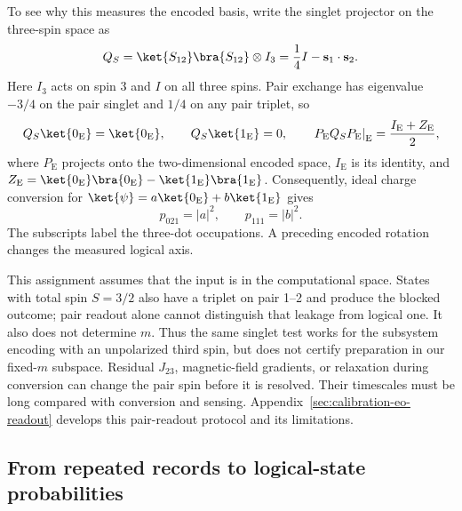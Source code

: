 To see why this measures the encoded basis, write the singlet
projector on the three-spin space as
\begin{equation}
  Q_S=\ket{S_{12}}\bra{S_{12}}\otimes I_3
       =\frac14 I-\mathbf{s}_1\cdot\mathbf{s}_2.
  \label{eq:eo-readout-projector}
\end{equation}
Here $I_3$ acts on spin 3 and $I$ on all three spins.
Pair exchange has eigenvalue $-3/4$ on the pair singlet and $1/4$
on any pair triplet, so
\begin{equation}
  Q_S\ket{0_{\mathrm E}}=\ket{0_{\mathrm E}},\qquad
  Q_S\ket{1_{\mathrm E}}=0,\qquad
  \left.P_{\mathrm E}Q_SP_{\mathrm E}\right|_{\mathrm E}
        =\frac{I_{\mathrm E}+Z_{\mathrm E}}{2},
  \label{eq:eo-logical-readout}
\end{equation}
where $P_{\mathrm E}$ projects onto the two-dimensional encoded
space, $I_{\mathrm E}$ is its identity, and
$Z_{\mathrm E}=\ket{0_{\mathrm E}}\bra{0_{\mathrm E}}
-\ket{1_{\mathrm E}}\bra{1_{\mathrm E}}$.
Consequently, ideal charge conversion for
$\ket{\psi}=a\ket{0_{\mathrm E}}+b\ket{1_{\mathrm E}}$ gives
\begin{equation}
  p_{021}=|a|^2,\qquad p_{111}=|b|^2.
  \label{eq:eo-readout-probabilities}
\end{equation}
The subscripts label the three-dot occupations.
A preceding encoded rotation changes the measured logical axis.

This assignment assumes that the input is in the computational
space. States with total spin $S=3/2$ also have a triplet on pair
1--2 and produce the blocked outcome; pair readout alone cannot
distinguish that leakage from logical one.
It also does not determine $m$. Thus the same singlet test works
for the subsystem encoding with an unpolarized third spin, but
does not certify preparation in our fixed-$m$ subspace.
Residual $J_{23}$, magnetic-field gradients, or relaxation during
conversion can change the pair spin before it is resolved.
Their timescales must be long compared with conversion and sensing.
Appendix~\ref{sec:calibration-eo-readout} develops this pair-readout
protocol and its limitations.

\subsection{From repeated records to logical-state probabilities}
\label{sec:platform-readout-probabilities}


